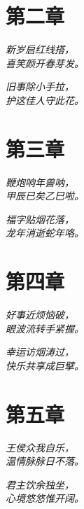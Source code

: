 \documentclass[12pt, a4paper, oneside]{book}
\newenvironment{poem}
  {\vspace{1em}\begin{flushleft}\itshape}
  {\end{flushleft}\vspace{1em}}
\begin{document}
\chapter{第二章}
\begin{poem}
新岁启红线搭，\\
喜笑颜开春芽发。\\
\end{poem}
\begin{poem}
旧事除小手拉，\\
护这佳人守此花。\\
\end{poem}

\chapter{第三章}
\begin{poem}
鞭炮响年兽呐，\\
甲辰已矣乙巳啦。\\
\end{poem}
\begin{poem}
福字贴烟花落，\\
龙年消逝蛇年咯。\\
\end{poem}

\chapter{第四章}
\begin{poem}
好事近烦恼破，\\
眼波流转手紧握。\\
\end{poem}
\begin{poem}
幸运访烟涛过，\\
快乐共享成巨擘。\\
\end{poem}

\chapter{第五章}
\begin{poem}
王侯众我自乐，\\
温情脉脉日不落。\\
\end{poem}
\begin{poem}
君主饮余独坐，\\
心境悠悠惟开阔。\\
\end{poem}
\end{document}
